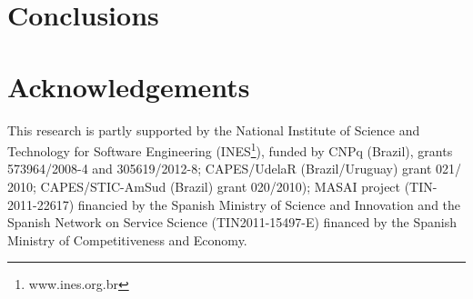\documentclass{llncs}
\theoremstyle{plain}
\theoremstyle{plain}
\theoremstyle{plain}
\begin{document}
\section{Conclusions}
\label{sec:conclusions}


\section*{Acknowledgements}
\small
This research is partly supported by the National Institute of Science and Technology for Software Engineering (INES\footnote{www.ines.org.br}), funded by CNPq (Brazil), grants 573964/2008-4 and 305619/2012-8; CAPES/UdelaR (Brazil/Uruguay) grant 021/ 2010; CAPES/STIC-AmSud (Brazil) grant 020/2010); MASAI project (TIN-2011-22617) financied by the Spanish Ministry of Science and Innovation and the Spanish Network on Service Science (TIN2011-15497-E) financed by the Spanish Ministry of Competitiveness and Economy. 
   

 
\end{document}
